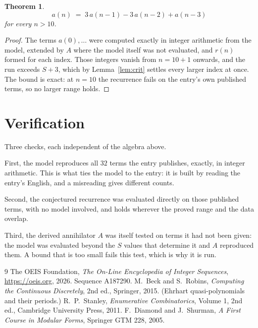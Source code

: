 \documentclass[11pt,a4paper]{article}
\theoremstyle{plain}
\newtheorem{theorem}{Theorem}
\theoremstyle{definition}
\begin{document}
\begin{theorem}
\[
a(n)\;=\;3\,a(n-1) - 3\,a(n-2) + a(n-3)
\]
for every $n>10$.
\end{theorem}

\begin{proof}
The terms $a(0),\dots$ were computed exactly in integer arithmetic from the model, extended by
$A$ where the model itself was not evaluated, and $r(n)$ formed for each index. Those integers
vanish from $n=10+1$ onwards, and the run exceeds $S+3$, which by
Lemma~\ref{lem:crit} settles every larger index at once. The bound is exact: at $n=10$ the recurrence fails on the entry's own published terms, so no larger range holds.
\end{proof}

\section{Verification}

Three checks, each independent of the algebra above.

First, the model reproduces all $32$ terms the entry publishes, exactly, in integer
arithmetic. This is what ties the model to the entry: it is built by reading the entry's
English, and a misreading gives different counts.

Second, the conjectured recurrence was evaluated directly on those published terms, with no
model involved, and holds wherever the proved range and the data overlap.

Third, the derived annihilator $A$ was itself tested on terms it had not been given: the model
was evaluated beyond the $S$ values that determine it and $A$ reproduced them. A bound that is
too small fails this test, which is why it is run.

\begin{thebibliography}{9}
 The OEIS Foundation, \emph{The On-Line Encyclopedia of Integer
Sequences}, \url{https://oeis.org}, 2026. Sequence A187290.
 M.~Beck and S.~Robins, \emph{Computing the Continuous Discretely},
2nd ed., Springer, 2015. (Ehrhart quasi-polynomials and their periods.)
 R.~P.~Stanley, \emph{Enumerative Combinatorics}, Volume 1, 2nd ed.,
Cambridge University Press, 2011.
 F.~Diamond and J.~Shurman, \emph{A First Course in Modular Forms},
Springer GTM 228, 2005.
\end{thebibliography}
\end{document}
